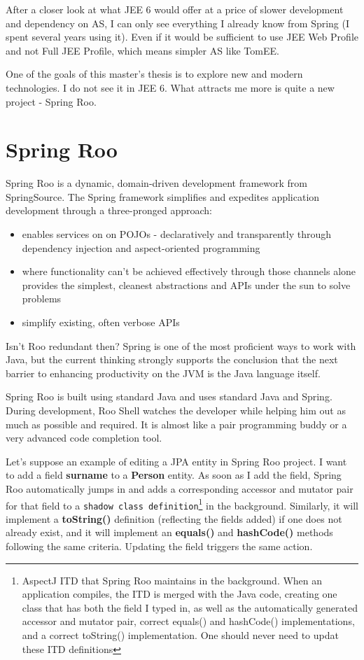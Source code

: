 	After a closer look at what JEE 6 would offer at a price of slower development and dependency on AS, I can only see
	everything I already know from Spring (I spent several years using it). Even if it would be sufficient to use JEE
	Web Profile and not Full JEE Profile, which means simpler AS like TomEE.
	
	One of the goals of this master's thesis is to explore new and modern technologies. I do not see it in JEE 6. What
	attracts me more is quite a new project - Spring Roo.
	
	\section{Spring Roo}
	
	\cite{roo}
	Spring Roo is a dynamic, domain-driven development framework from SpringSource. The Spring framework simplifies and
	expedites application development through a three-pronged approach:
	
	\begin{itemize}
		\item enables services on on POJOs - declaratively and transparently through dependency injection and aspect-oriented
		programming
		\item where functionality can’t be achieved effectively through those channels alone provides the simplest, cleanest
		abstractions and APIs under the sun to solve problems 
		\item simplify existing, often verbose APIs
	\end{itemize} 

	Isn't Roo redundant then? Spring is one of the most proficient ways to work with Java, but the current thinking
	strongly supports the conclusion that the next barrier to enhancing productivity on the JVM is the Java language
	itself.

	Spring Roo is built using standard Java and uses standard Java and Spring. During development, Roo Shell watches the
	developer while helping him out as much as possible and required. It is almost like a pair programming buddy or a very
	advanced code completion tool.

	Let's suppose an example of editing a JPA entity in Spring Roo project. I want to add a field \textbf{surname} to a
	\textbf{Person} entity. As soon as I add the field, Spring Roo automatically jumps in and adds a corresponding accessor
	and mutator pair for that field to a \verb|shadow class definition|\footnote{AspectJ \gls{ITD} that Spring Roo
	maintains in the background. When an application compiles, the ITD is merged with the Java code, creating one class
	that has both the field I typed in, as well as the automatically generated accessor and mutator pair, correct equals()
	and hashCode() implementations, and a correct toString() implementation. One should never need to updat these ITD
	definitions} in the background. Similarly, it will implement a \textbf{toString()} definition (reflecting the fields
	added) if one does not already exist, and it will implement an \textbf{equals()} and \textbf{hashCode()} methods
	following the same criteria. Updating the field triggers the same action.
	
